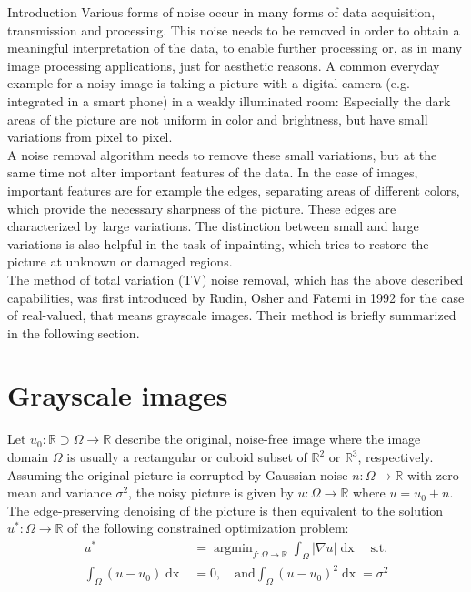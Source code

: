 \begin{chapter}{Introduction}
\label{ch:introduction}
Various forms of noise occur in many forms of data acquisition, transmission and processing.
This noise needs to be removed in order to obtain a meaningful interpretation of the data, to enable further processing or, as in many image processing 
applications, just for aesthetic reasons. A common everyday example for a noisy image is taking a picture with a digital camera (e.g. integrated in a smart phone) in a weakly illuminated room:
Especially the dark areas of the picture are not uniform in color and brightness, but have small variations from pixel to pixel.\\

A noise removal algorithm needs to remove these small variations, but at the same time not alter important features of the data. In the case of images, important features are for example 
the edges, separating areas of different colors, which provide the necessary sharpness of the picture. These edges are characterized by large variations. The distinction
between small and large variations is also helpful in the task of inpainting, which tries to restore the picture at unknown or damaged regions.\\

The method of total variation (TV) noise removal, which has the above described capabilities, was first introduced by Rudin, Osher and Fatemi \cite{RudinOsher} in 1992
for the case of real-valued, that means grayscale images. Their method is briefly summarized in the following section.

\section{Grayscale images}
Let $u_0:  \mathbb{R}\supset\Omega\to \mathbb{R}$ describe the original, noise-free image where the image domain $\Omega$ is usually a rectangular or cuboid subset of $\mathbb{R}^2$ or $\mathbb{R}^3$, respectively. 
Assuming the original picture is corrupted by Gaussian noise $n: \Omega\to\mathbb{R}$ with zero mean and variance $\sigma^2$, the noisy picture is given by $u: \Omega\to \mathbb{R}$ where
$u = u_0 + n$. The edge-preserving denoising of the picture is then equivalent to the solution $u^* :\Omega\to \mathbb{R}$ of the following constrained optimization problem:
\begin{align}
    \label{osher_opt}
    u^* &= \operatorname{argmin}_{f: \Omega\to \mathbb{R}}\int_\Omega\left\vert\nabla u\right\vert \mathop{dx} \quad\text{s.t.}\\
    \int_\Omega(u-u_0)\mathop{dx} &= 0, \quad\text{and} \int_\Omega(u-u_0)^2 \mathop{dx}= \sigma^2
\end{align}


\end{chapter}
